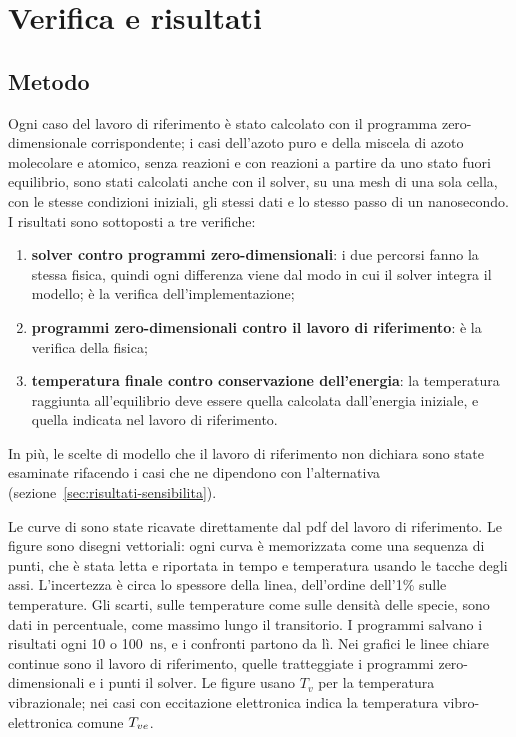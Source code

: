 \section{Verifica e risultati}
\label{sec:risultati}

\subsection{Metodo}
\label{sec:metodo}

Ogni caso del lavoro di riferimento è stato calcolato con il programma
zero-dimensionale corrispondente; i casi dell'azoto puro e della miscela di
azoto molecolare e atomico, senza reazioni e con reazioni a partire da uno
stato fuori equilibrio, sono stati calcolati anche con il solver, su una mesh
di una sola cella, con le stesse condizioni iniziali, gli stessi dati e lo
stesso passo di un nanosecondo. I risultati sono sottoposti a tre verifiche:

\begin{enumerate}[leftmargin=1.8em]
  \item \textbf{solver contro programmi zero-dimensionali}: i due percorsi
    fanno la stessa fisica, quindi ogni differenza viene dal modo in cui il
    solver integra il modello; è la verifica dell'implementazione;
  \item \textbf{programmi zero-dimensionali contro il lavoro di riferimento}:
    è la verifica della fisica;
  \item \textbf{temperatura finale contro conservazione dell'energia}: la
    temperatura raggiunta all'equilibrio deve essere quella calcolata
    dall'energia iniziale, e quella indicata nel lavoro di riferimento.
\end{enumerate}

In più, le scelte di modello che il lavoro di riferimento non dichiara sono
state esaminate rifacendo i casi che ne dipendono con l'alternativa
(sezione~\ref{sec:risultati-sensibilita}).

Le curve di \hyfoam{} sono state ricavate direttamente dal pdf del lavoro di riferimento.
Le figure sono disegni vettoriali: ogni curva è memorizzata come una sequenza
di punti, che è stata letta e riportata in tempo e temperatura usando le tacche
degli assi. L'incertezza è circa lo spessore della linea, dell'ordine dell'1\%
sulle temperature. Gli scarti, sulle temperature come sulle densità delle
specie, sono dati in percentuale, come massimo lungo il transitorio. I
programmi salvano i risultati ogni 10 o 100~ns, e i confronti partono da lì.
Nei grafici le linee chiare continue sono il lavoro di riferimento, quelle
tratteggiate i programmi zero-dimensionali e i punti il solver. Le figure
usano $T_v$ per la temperatura vibrazionale; nei casi con eccitazione
elettronica indica la temperatura vibro-elettronica comune $T_{ve}$.

